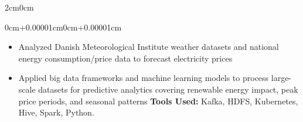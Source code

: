 \documentclass[10pt, a4paper]{article}
\newenvironment{highlights}{
    \begin{itemize}[
        topsep=0.08cm, parsep=0.08cm, partopsep=0pt,
        itemsep=0pt, leftmargin=0cm+10pt
    ]
}{
    \end{itemize}
}
\newenvironment{onecolentry}{
    \begin{adjustwidth}{0cm+0.00001cm}{0cm+0.00001cm}
}{
    \end{adjustwidth}
}
\begin{document}
\begin{adjustwidth}{2cm}{0cm}
\vspace{0.10 cm}
\begin{onecolentry}
\begin{highlights}
\item Analyzed Danish Meteorological Institute weather datasets and national energy consumption/price data to forecast electricity prices
\item Applied big data frameworks and machine learning models to process large-scale datasets for predictive analytics covering renewable energy impact, peak price periods, and seasonal patterns \textbf{Tools Used:} Kafka, HDFS, Kubernetes, Hive, Spark, Python.
\end{highlights}
\end{onecolentry}


\end{adjustwidth}
\end{document}
